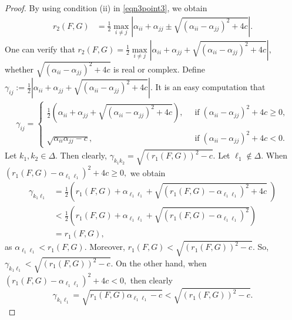 \documentclass[final,1p,times]{elsarticle}
\begin{document}
	
	\begin{proof}
		By using condition (ii) in \eqref{eqn3point3}, we obtain
		\begin{align*}
			r_{2} (F,G) &= \frac{1}{2} \max_{i\neq j} \left|  \alpha_{ii} + \alpha_{jj} \pm \sqrt{( \alpha_{ii} -  \alpha_{jj})^2 + 4c}\right| .
		\end{align*}
		One can verify that  $r_{2} (F,G)  =  \frac{1}{2} \max\limits_{i\neq j} \left|  \alpha_{ii} + \alpha_{jj} + \sqrt{( \alpha_{ii} -  \alpha_{jj})^2 + 4c}\right|, $ whether $\sqrt{( \alpha_{ii} -  \alpha_{jj})^2 + 4c }$ is real or complex. Define $\gamma_{ij} := \frac{1}{2} \left|  \alpha_{ii} + \alpha_{jj} + \sqrt{( \alpha_{ii} -  \alpha_{jj})^2 + 4c}\right|.$ It is an easy computation that
		\begin{align*}
			\gamma_{ij} = \begin{cases}
				\frac{1}{2} \left( \alpha_{ii} + \alpha_{jj} + \sqrt{( \alpha_{ii} -  \alpha_{jj})^2 + 4c}\right),\;\; & \text{if}\; ( \alpha_{ii} -  \alpha_{jj})^2 + 4c \geq 0,\\~\\
				\sqrt{ \alpha_{ii}\alpha_{jj}-c}, \;\;& \text{if}\; ( \alpha_{ii} -  \alpha_{jj})^2 + 4c < 0.
			\end{cases}
		\end{align*}
		Let $k_1,k_2 \in \Delta.$ Then clearly, $\gamma_{k_1 k_2} = \sqrt{\left(r_{1} (F,G)\right)^2-c}.$ Let $\ell_1 \notin \Delta.$ When $\left(  r_{1} (F,G) -  \alpha_{\ell_1 \ell_1}\right)^2 +4c \geq 0,$ we obtain
		\begin{align*}
			\gamma_{k_1 \ell_1 } &= \frac{1}{2}  \left( r_{1} (F,G)  +  \alpha_{\ell_1 \ell_1} + \sqrt{\left(  r_{1} (F,G) -  \alpha_{\ell_1 \ell_1}\right)^2 +4c}\; \right) \\&< \frac{1}{2}  \left( r_{1} (F,G)   + \alpha_{\ell_1 \ell_1} + \sqrt{\left(  r_{1} ( F,G) -   \alpha_{\ell_1 \ell_1}\right)^2 }\right) \\&=  r_{1} (F,G),
		\end{align*}
		as $ \alpha_{\ell_1 \ell_1} < r_{1} (F,G).$ Moreover, $r_{1} (F,G) < \sqrt{\left(r_{1} (F,G)\right)^2-c}. $ So, $\gamma_{k_1 \ell_1 } < \sqrt{\left(r_{1} (F,G)\right)^2-c}.$ On the other hand, when $\left(  r_{1} (F,G) -   \alpha_{\ell_1 \ell_1}\right)^2 +4c < 0,$ then clearly
		$$\gamma_{k_1 \ell_1 } =  \sqrt{r_{1} (F,G)  \alpha_{\ell_1 \ell_1} -c} < \sqrt{\left(r_{1} (F,G)\right)^2-c}.$$

\end{proof}
\end{document}

